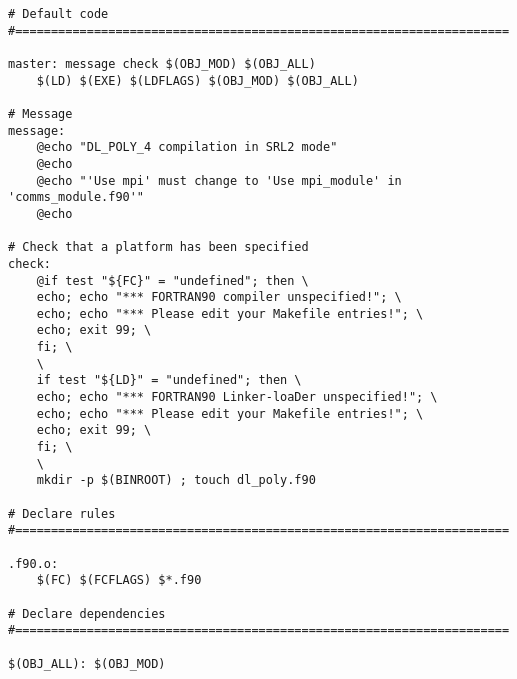 \begin{verbatim}
# Default code
#=====================================================================

master: message check $(OBJ_MOD) $(OBJ_ALL)
	$(LD) $(EXE) $(LDFLAGS) $(OBJ_MOD) $(OBJ_ALL)

# Message
message:
	@echo "DL_POLY_4 compilation in SRL2 mode"
	@echo
	@echo "'Use mpi' must change to 'Use mpi_module' in 'comms_module.f90'"
	@echo

# Check that a platform has been specified
check:
	@if test "${FC}" = "undefined"; then \
	echo; echo "*** FORTRAN90 compiler unspecified!"; \
	echo; echo "*** Please edit your Makefile entries!"; \
	echo; exit 99; \
	fi; \
	\
	if test "${LD}" = "undefined"; then \
	echo; echo "*** FORTRAN90 Linker-loaDer unspecified!"; \
	echo; echo "*** Please edit your Makefile entries!"; \
	echo; exit 99; \
	fi; \
	\
	mkdir -p $(BINROOT) ; touch dl_poly.f90

# Declare rules
#=====================================================================

.f90.o:
	$(FC) $(FCFLAGS) $*.f90

# Declare dependencies
#=====================================================================

$(OBJ_ALL): $(OBJ_MOD)
\end{verbatim}
